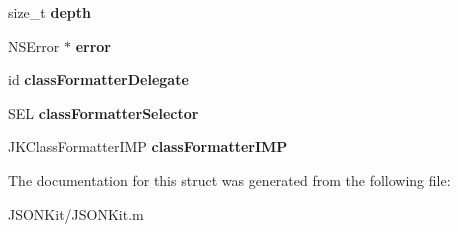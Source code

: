 \begin{DoxyCompactItemize}
\item 
\hypertarget{struct_j_k_encode_state_a0f95ac1d47e8408d4108e12d226b6fc2}{size\+\_\+t {\bfseries depth}}\label{struct_j_k_encode_state_a0f95ac1d47e8408d4108e12d226b6fc2}

\item 
\hypertarget{struct_j_k_encode_state_a06a37dda06467b599ec7b24093b4982f}{N\+S\+Error $\ast$ {\bfseries error}}\label{struct_j_k_encode_state_a06a37dda06467b599ec7b24093b4982f}

\item 
\hypertarget{struct_j_k_encode_state_a15a9d6710ae0bd0851fcc7d9756768a6}{id {\bfseries class\+Formatter\+Delegate}}\label{struct_j_k_encode_state_a15a9d6710ae0bd0851fcc7d9756768a6}

\item 
\hypertarget{struct_j_k_encode_state_ad29de3691eba8128cd70cc5f362f60d0}{S\+E\+L {\bfseries class\+Formatter\+Selector}}\label{struct_j_k_encode_state_ad29de3691eba8128cd70cc5f362f60d0}

\item 
\hypertarget{struct_j_k_encode_state_a8f58e19530ef145df0ecf1ac35865d2e}{J\+K\+Class\+Formatter\+I\+M\+P {\bfseries class\+Formatter\+I\+M\+P}}\label{struct_j_k_encode_state_a8f58e19530ef145df0ecf1ac35865d2e}

\end{DoxyCompactItemize}


The documentation for this struct was generated from the following file\+:\begin{DoxyCompactItemize}
\item 
J\+S\+O\+N\+Kit/J\+S\+O\+N\+Kit.\+m\end{DoxyCompactItemize}
